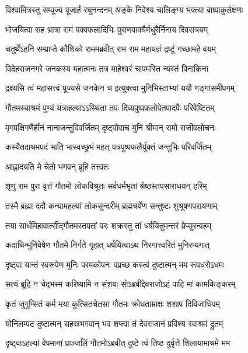 \twolineshloka
{विश्वामित्रस्तु सम्पूज्य पूजार्हं रघुनन्दनम्}
{अङ्के निवेश्य चालिङ्ग्य भक्त्या बाष्पाकुलेक्षणः} %

\twolineshloka
{भोजयित्वा सह भ्रात्रा रामं पक्वफलादिभिः}
{पुराणवाक्यैर्मधुरैर्निनाय दिवसत्रयम्} %

\twolineshloka
{चतुर्थेऽहनि सम्प्राप्ते कौशिको राममब्रवीत्}
{राम राम महायज्ञं द्रष्टुं गच्छामहे वयम्} %

\twolineshloka
{विदेहराजनगरे जनकस्य महात्मनः}
{तत्र माहेश्वरं चापमस्ति न्यस्तं पिनाकिना} %

\twolineshloka
{द्रक्ष्यसि त्वं महासत्त्वं पूज्यसे जनकेन च}
{इत्युक्त्वा मुनिभिस्ताभ्यां ययौ गङ्गासमीपगम्} %

\twolineshloka
{गौतमस्याश्रमं पुण्यं यत्राहल्याऽऽस्थिता तपः}
{दिव्यपुष्पफलोपेतपादपैः परिवेष्टितम्} %

\twolineshloka
{मृगपक्षिगणैर्हीनं नानाजन्तुविवर्जितम्}
{दृष्ट्वोवाच मुनिं श्रीमान् रामो राजीवलोचनः} %

\twolineshloka
{कस्यैतदाश्रमपदं भाति भास्वच्छुभं महत्}
{पत्रपुष्पफलैर्युक्तं जन्तुभिः परिवर्जितम्} %

\onelineshloka
{आह्लादयति मे चेतो भगवन् ब्रूहि तत्त्वतः} %


\twolineshloka
{शृणु राम पुरा वृत्तं गौतमो लोकविश्रुतः}
{सर्वधर्मभृतां श्रेष्ठस्तपसाराधयन् हरिम्} %

\twolineshloka
{तस्मै ब्रह्मा ददौ कन्यामहल्यां लोकसुन्दरीम्}
{ब्रह्मचर्येण सन्तुष्टः शुश्रूषणपरायणाम्} %

\twolineshloka
{तया सार्धमिहावात्सीद्गौतमस्तपतां वरः}
{शक्रस्तु तां धर्षयितुमन्तरं प्रेप्सुरन्वहम्} %

\twolineshloka
{कदाचिन्मुनिवेषेण गौतमे निर्गते गृहात्}
{धर्षयित्वाऽथ निरगात्त्वरितं मुनिरप्यगात्} %

\twolineshloka
{दृष्ट्वा यान्तं स्वरूपेण मुनिः परमकोपनः}
{पप्रच्छ कस्त्वं दुष्टात्मन् मम रूपधरोऽधमः} %

\twolineshloka
{सत्यं ब्रूहि न चेद्भस्म करिष्यामि न संशयः}
{सोऽब्रवीद्देवराजोऽहं पाहि मां कामकिङ्करम्} %

\twolineshloka
{कृतं जुगुप्सितं कर्म मया कुत्सितचेतसा}
{गौतमः क्रोधताम्राक्षः शशाप दिविजाधिपम्} %

\twolineshloka
{योनिलम्पट दुष्टात्मन् सहस्रभगवान् भव}
{शप्त्वा तं देवराजानं प्रविश्य स्वाश्रमं द्रुतम्} %

\twolineshloka
{दृष्ट्वाऽहल्यां वेपमानां प्राञ्जलिं गौतमोऽब्रवीत्}
{दुष्टे त्वं तिष्ठ दुर्वृत्ते शिलायामाश्रमे मम} %

